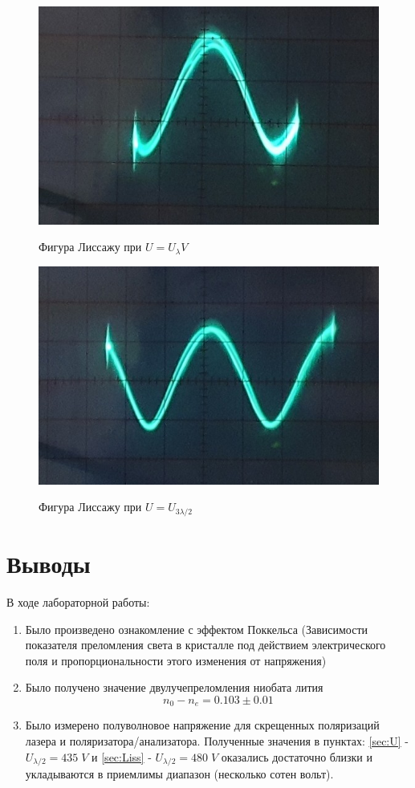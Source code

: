 \documentclass{article}
\begin{document}
\begin{figure}[H]
  \centering
  \includegraphics[width=\textwidth]{L2.jpg}\label{fig:L2}
  \caption{Фигура Лиссажу при \(U = U_{\lambda}V\)}
\end{figure}

\begin{figure}[H]
  \centering
  \includegraphics[width=\textwidth]{L3.jpg}\label{fig:L3}
  \caption{Фигура Лиссажу при \(U = U_{3\lambda/2}\)}
\end{figure}

\section{Выводы}
В ходе лабораторной работы:
\begin{enumerate}
  \item Было произведено ознакомление с эффектом Поккельса (Зависимости показателя преломления света в кристалле под действием
  электрического поля и пропорциональности этого изменения от напряжения)
  \item Было получено значение двулучепреломления ниобата лития \[ n_0-n_e = 0.103\pm 0.01 \]
  \item Было измерено полуволновое напряжение для скрещенных поляризаций лазера и поляризатора/анализатора. Полученные значения
  в пунктах: \ref{sec:U} - \(U_{\lambda/2} = 435\;V \) и \ref{sec:Liss} - \(U_{\lambda/2} = 480\;V \) оказались достаточно близки
  и укладываются в приемлимы диапазон (несколько сотен вольт).
\end{enumerate}
\end{document}
